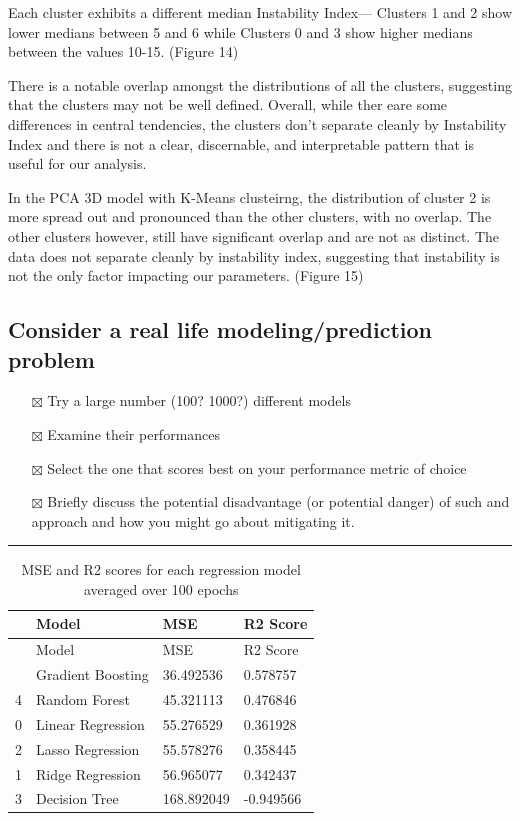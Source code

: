 \documentclass[
  letterpaper,
  DIV=11,
  numbers=noendperiod]{scrartcl}
\providecommand{\tightlist}{%
  \setlength{\itemsep}{0pt}\setlength{\parskip}{0pt}}\usepackage{longtable,booktabs,array}
\begin{document}
Each cluster exhibits a different median Instability Index--- Clusters 1
and 2 show lower medians between 5 and 6 while Clusters 0 and 3 show
higher medians between the values 10-15. (Figure 14)

There is a notable overlap amongst the distributions of all the
clusters, suggesting that the clusters may not be well defined. Overall,
while ther eare some differences in central tendencies, the clusters
don't separate cleanly by Instability Index and there is not a clear,
discernable, and interpretable pattern that is useful for our analysis.

In the PCA 3D model with K-Means clusteirng, the distribution of cluster
2 is more spread out and pronounced than the other clusters, with no
overlap. The other clusters however, still have significant overlap and
are not as distinct. The data does not separate cleanly by instability
index, suggesting that instability is not the only factor impacting our
parameters. (Figure 15)

\subsection{Consider a real life modeling/prediction
problem}\label{consider-a-real-life-modelingprediction-problem}

\begin{itemize}
\tightlist
\item[$\boxtimes$]
  Try a large number (100? 1000?) different models
\item[$\boxtimes$]
  Examine their performances
\item[$\boxtimes$]
  Select the one that scores best on your performance metric of choice
\item[$\boxtimes$]
  Briefly discuss the potential disadvantage (or potential danger) of
  such and approach and how you might go about mitigating it.
\end{itemize}

\begin{center}\rule{0.5\linewidth}{0.5pt}\end{center}

\label{model-performance-table}
\begin{longtable}[]{@{}llll@{}}
\caption{MSE and R2 scores for each regression model averaged over 100
epochs}\tabularnewline
\toprule\noalign{}
& Model & MSE & R2 Score \\
\midrule\noalign{}
\endfirsthead
\toprule\noalign{}
& Model & MSE & R2 Score \\
\midrule\noalign{}
\endhead
\bottomrule\noalign{}
\endlastfoot
5 & Gradient Boosting & 36.492536 & 0.578757 \\
4 & Random Forest & 45.321113 & 0.476846 \\
0 & Linear Regression & 55.276529 & 0.361928 \\
2 & Lasso Regression & 55.578276 & 0.358445 \\
1 & Ridge Regression & 56.965077 & 0.342437 \\
3 & Decision Tree & 168.892049 & -0.949566 \\
\end{longtable}
\end{document}
